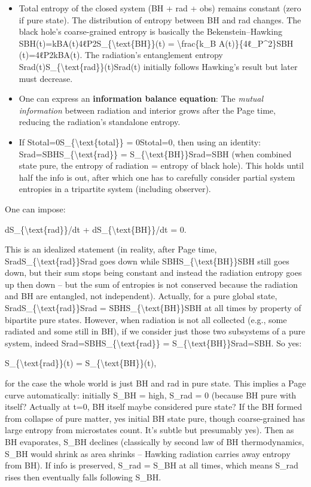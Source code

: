 \documentclass[]{article}
\begin{document}
\begin{itemize}
\item
  Total entropy of the closed system (BH + rad + obs) remains constant
  (zero if pure state). The distribution of entropy between BH and rad
  changes. The black hole's coarse-grained entropy is basically the
  Bekenstein--Hawking
  SBH(t)=kBA(t)4ℓP2S\_\{\textbackslash{}text\{BH\}\}(t) =
  \textbackslash{}frac\{k\_B A(t)\}\{4ℓ\_P\^{}2\}SBH​(t)=4ℓP2​kB​A(t)​.
  The radiation's entanglement entropy
  Srad(t)S\_\{\textbackslash{}text\{rad\}\}(t)Srad​(t) initially follows
  Hawking's result but later must decrease.
\item
  One can express an \textbf{information balance equation}: The
  \emph{mutual information} between radiation and interior grows after
  the Page time, reducing the radiation's standalone entropy.
\item
  If Stotal=0S\_\{\textbackslash{}text\{total\}\} = 0Stotal​=0, then
  using an identity: Srad=SBHS\_\{\textbackslash{}text\{rad\}\} =
  S\_\{\textbackslash{}text\{BH\}\}Srad​=SBH​ (when combined state pure,
  the entropy of radiation = entropy of black hole). This holds until
  half the info is out, after which one has to carefully consider
  partial system entropies in a tripartite system (including observer).
\end{itemize}

One can impose:

dS\_\{\textbackslash{}text\{rad\}\}/dt +
dS\_\{\textbackslash{}text\{BH\}\}/dt = 0.

This is an idealized statement (in reality, after Page time,
SradS\_\{\textbackslash{}text\{rad\}\}Srad​ goes down while
SBHS\_\{\textbackslash{}text\{BH\}\}SBH​ still goes down, but their sum
stops being constant and instead the radiation entropy goes up then down
-- but the sum of entropies is not conserved because the radiation and
BH are entangled, not independent). Actually, for a pure global state,
SradS\_\{\textbackslash{}text\{rad\}\}Srad​ =
SBHS\_\{\textbackslash{}text\{BH\}\}SBH​ at all times by property of
bipartite pure states. However, when radiation is not all collected
(e.g., some radiated and some still in BH), if we consider just those
two subsystems of a pure system, indeed
Srad=SBHS\_\{\textbackslash{}text\{rad\}\} =
S\_\{\textbackslash{}text\{BH\}\}Srad​=SBH​. So yes:

S\_\{\textbackslash{}text\{rad\}\}(t) =
S\_\{\textbackslash{}text\{BH\}\}(t),

for the case the whole world is just BH and rad in pure state. This
implies a Page curve automatically: initially S\_BH = high, S\_rad = 0
(because BH pure with itself? Actually at t=0, BH itself maybe
considered pure state? If the BH formed from collapse of pure matter,
yes initial BH state pure, though coarse-grained has large entropy from
microstates count. It's subtle but presumably yes). Then as BH
evaporates, S\_BH declines (classically by second law of BH
thermodynamics, S\_BH would shrink as area shrinks -- Hawking radiation
carries away entropy from BH). If info is preserved, S\_rad = S\_BH at
all times, which means S\_rad rises then eventually falls following
S\_BH.
\end{document}
